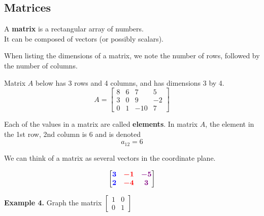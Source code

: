 \documentclass{article}
\begin{document}
\newpage

\subsection*{Matrices}

A \textbf{matrix} is a rectangular array of numbers. \newline\\
It can be composed of vectors (or possibly scalars).	\vspace{2in}

When listing the dimensions of a matrix, we note the number of rows, followed by the number of columns. 
\vspace{2in}

Matrix $A$ below has 3 rows and 4 columns, and has dimensions 3 by 4.
\[	A = \begin{bmatrix}
8 & 6 & 7 & 5 \\
3 & 0 & 9 & -2 \\
0 & 1 & -10 & 7 
\end{bmatrix}
\]
\vspace{1in}


Each of the values in a matrix are called \textbf{elements}. In matrix $A$, the element in the 1st row, 2nd column is 6 and is denoted
\[ a_{12} = 6 \]

\newpage

We can think of a matrix as several vectors in the coordinate plane. \vspace{0.5in}

\[
\begin{bmatrix}
{\color{blue}\bm{3}} & {\color{red}\bm{-1}} & {\color{violet}\bm{-5}} \\
{\color{blue}\bm{2}} & {\color{red}\bm{-4}} & {\color{violet}\bm{3}} 
\end{bmatrix}
\]
\begin{center}
\end{center}
\vfill

{\color{red}\textbf{Example 4.}} Graph the matrix $\begin{bmatrix}
1 & 0 \\
0 & 1
\end{bmatrix}$
\begin{center}
\end{center}
\end{document}
